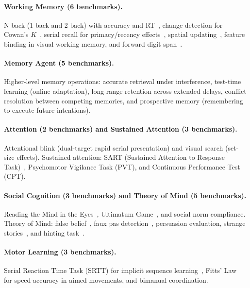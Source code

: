 \documentclass[11pt,letterpaper]{article}
\begin{document}
\paragraph{Working Memory (6 benchmarks).} N-back (1-back and 2-back) with accuracy and RT~\citep{jaeggi2010relationship,owen2005nback}, change detection for Cowan's $K$~\citep{luck1997capacity,cowan2001magical}, serial recall for primacy/recency effects~\citep{murdock1962serial}, spatial updating~\citep{oberauer2003selective}, feature binding in visual working memory, and forward digit span~\citep{wechsler2008wais}.

\paragraph{Memory Agent (5 benchmarks).} Higher-level memory operations: accurate retrieval under interference, test-time learning (online adaptation), long-range retention across extended delays, conflict resolution between competing memories, and prospective memory (remembering to execute future intentions).

\paragraph{Attention (2 benchmarks) and Sustained Attention (3 benchmarks).} Attentional blink (dual-target rapid serial presentation) and visual search (set-size effects). Sustained attention: SART (Sustained Attention to Response Task)~\citep{robertson1997sustained}, Psychomotor Vigilance Task (PVT), and Continuous Performance Test (CPT).

\paragraph{Social Cognition (3 benchmarks) and Theory of Mind (5 benchmarks).} Reading the Mind in the Eyes~\citep{baroncohen2001eyes}, Ultimatum Game~\citep{guth1982experimental}, and social norm compliance. Theory of Mind: false belief~\citep{baroncohen1985mindblindness}, faux pas detection~\citep{stone1998faux}, persuasion evaluation, strange stories~\citep{happe1994advanced}, and hinting task~\citep{corcoran1995schizophrenia}.

\paragraph{Motor Learning (3 benchmarks).} Serial Reaction Time Task (SRTT) for implicit sequence learning~\citep{nissen1987attentional}, Fitts' Law~\citep{fitts1954information} for speed-accuracy in aimed movements, and bimanual coordination.
\end{document}
